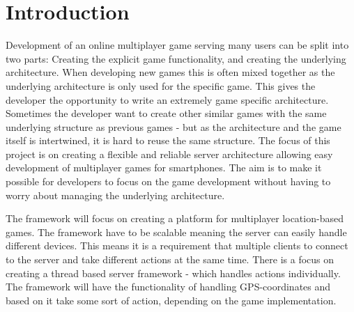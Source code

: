 \chapter{Introduction}
\label{chap:intro}




Development of an online multiplayer game serving many users can be split into two parts: Creating the explicit game functionality, and creating the underlying architecture. When developing new games this is often mixed together as the underlying architecture is only used for the specific game. This gives the developer the opportunity to write an extremely game specific architecture. Sometimes the developer want to create other similar games with the same underlying structure as previous games - but as the architecture and the game itself is intertwined, it is hard to reuse the same structure.
The focus of this project is on creating a flexible and reliable server architecture  allowing easy development of multiplayer games for smartphones. The aim is to make it possible for developers to focus on the game development without having to worry about managing the underlying architecture. 

The framework will focus on creating a platform for multiplayer location-based games. The framework have to be scalable meaning the server can easily handle different devices. This means it is a requirement that multiple clients to connect to the server and take different actions at the same time. There is a focus on creating a thread based server framework - which handles actions individually. The framework will have the functionality of handling GPS-coordinates and based on it take some sort of action, depending on the game implementation. 

